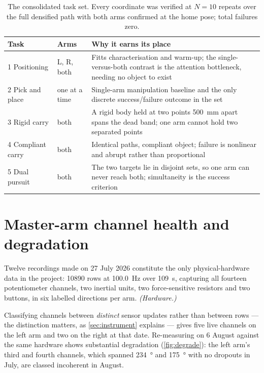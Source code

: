 \begin{table}[htbp]
  \centering
  \caption[The five-task set]{The consolidated task set. Every coordinate was
  verified at $N=10$ repeats over the full densified path with both arms
  confirmed at the home pose; total failures zero.}
  \label{tab:tasks}
  \begin{tabular}{llp{62mm}}
    \toprule
    Task & Arms & Why it earns its place \\
    \midrule
    1 Positioning & L, R, both & Fitts characterisation and warm-up; the
      single-versus-both contrast is the attention bottleneck, needing no
      object to exist \\
    2 Pick and place & one at a time & Single-arm manipulation baseline and the
      only discrete success/failure outcome in the set \\
    3 Rigid carry & both & A rigid body held at two points \SI{500}{\milli\metre}
      apart spans the dead band; one arm cannot hold two separated points \\
    4 Compliant carry & both & Identical paths, compliant object; failure is
      nonlinear and abrupt rather than proportional \\
    5 Dual pursuit & both & The two targets lie in disjoint sets, so one arm
      can never reach both; simultaneity is the success criterion \\
    \bottomrule
  \end{tabular}
\end{table}


\section{Master-arm channel health and degradation}
\label{sec:channels}

Twelve recordings made on 27 July 2026 constitute the only physical-hardware
data in the project: \num{10890} rows at \SI{100.0}{\hertz} over
\SI{109}{\second}, capturing all fourteen potentiometer channels, two inertial
units, two force-sensitive resistors and two buttons, in six labelled
directions per arm. \emph{(Hardware.)}

Classifying channels between \emph{distinct} sensor updates rather than
between rows --- the distinction matters, as \cref{sec:instrument} explains ---
gives five live channels on the left arm and two on the right at that date.
Re-measuring on 6 August against the same hardware shows substantial
degradation (\cref{fig:degrade}): the left arm's third and fourth channels,
which spanned \SI{234}{\degree} and \SI{175}{\degree} with no dropouts in July,
are classed incoherent in August.

